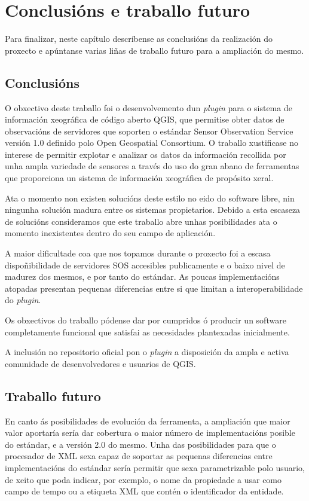 \chapter{Conclusións e traballo futuro}

Para finalizar, neste capítulo descríbense as conclusións da realización do proxecto e apúntanse varias liñas de traballo futuro para a ampliación do mesmo.

\section{Conclusións}
O obxectivo deste traballo foi o desenvolvemento dun \emph{plugin} para o sistema de información xeográfica de código aberto QGIS, que permitise obter datos de observacións de servidores que soporten o estándar Sensor Observation Service versión 1.0 definido polo Open Geospatial Consortium. O traballo xustificase no interese de permitir explotar e analizar os datos da información recollida por unha ampla variedade de sensores a través do uso do gran abano de ferramentas que proporciona un sistema de información xeográfica de propósito xeral.

Ata o momento non existen solucións deste estilo no eido do software libre, nin ningunha solución madura entre os sistemas propietarios. Debido a esta escaseza de solucións consideramos que este traballo abre unhas posibilidades ata o momento inexistentes dentro do seu campo de aplicación.

A maior dificultade coa que nos topamos durante o proxecto foi a escasa dispoñibilidade de servidores SOS accesibles publicamente e o baixo nivel de madurez dos mesmos, e por tanto do estándar. As poucas implementacións atopadas presentan pequenas diferencias entre si que limitan a interoperabilidade do \emph{plugin}.

Os obxectivos do traballo pódense dar por cumpridos ó producir un software completamente funcional que satisfai as necesidades plantexadas inicialmente.

A inclusión no repositorio oficial pon o \emph{plugin} a disposición da ampla e activa comunidade de desenvolvedores e usuarios de QGIS.

\section{Traballo futuro}
En canto ás posibilidades de evolución da ferramenta, a ampliación que maior valor aportaría sería dar cobertura o maior número de implementacións posible do estándar, e a versión 2.0 do mesmo. Unha das posibilidades para que o procesador de XML sexa capaz de soportar as pequenas diferencias entre implementacións do estándar sería permitir que sexa parametrizable polo usuario, de xeito que poda indicar, por exemplo, o nome da propiedade a usar como campo de tempo ou a etiqueta XML que contén o identificador da entidade.

